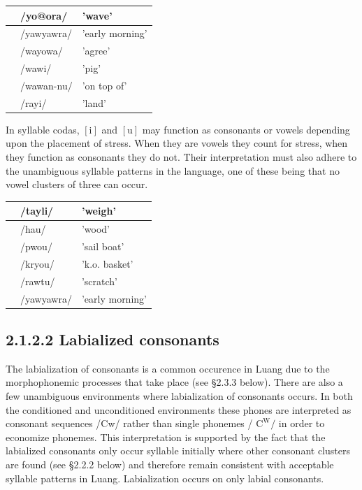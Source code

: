 \documentclass[10pt]{article}
\begin{document}
\begin{center}
\begin{tabular}{|l|l|l|}
\hline
[yo'Torə] & /yo@ora/ & 'wave' \\
\hline
[yav'yaurə] & /yawyawra/ & 'early morning' \\
\hline
[wa'yowə] & /wayowa/ & 'agree' \\
\hline
['wavi] & /wawi/ & 'pig' \\
\hline
['wawannu] & /wawan-nu/ & 'on top of' \\
\hline
['rayi] & /rayi/ & 'land' \\
\hline
\end{tabular}
\end{center}

In syllable codas, \([\mathrm{i}]\) and \([\mathrm{u}]\) may function as consonants or vowels depending upon the placement of stress. When they are vowels they count for stress, when they function as consonants they do not. Their interpretation must also adhere to the unambiguous syllable patterns in the language, one of these being that no vowel clusters of three can occur.

\begin{center}
\begin{tabular}{|l|l|l|}
\hline
['taili] & /tayli/ & 'weigh' \\
\hline
['3au] & /hau/ & 'wood' \\
\hline
['pwou] & /pwou/ & 'sail boat' \\
\hline
['kryou] & /kryou/ & 'k.o. basket' \\
\hline
['ravtu] & /rawtu/ & 'scratch' \\
\hline
[yav'yauræ] & /yawyawra/ & 'early morning' \\
\hline
\end{tabular}
\end{center}

\subsection*{2.1.2.2 Labialized consonants}
The labialization of consonants is a common occurence in Luang due to the morphophonemic processes that take place (see §2.3.3 below). There are also a few unambiguous environments where labialization of consonants occurs. In both the conditioned and unconditioned environments these phones are interpreted as consonant sequences /Cw/ rather than single phonemes / \(\mathrm{C}^{\mathrm{W}} /\) in order to economize phonemes. This interpretation is supported by the fact that the labialized consonants only occur syllable initially where other consonant clusters are found (see §2.2.2 below) and therefore remain consistent with acceptable syllable patterns in Luang. Labialization occurs on only labial consonants.
\end{document}
